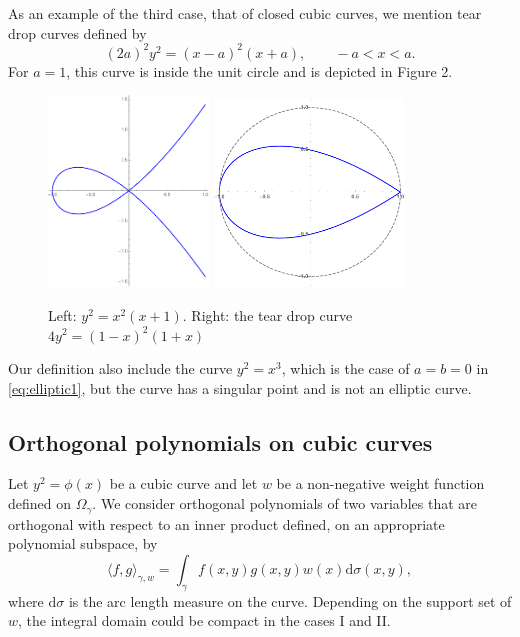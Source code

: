 \documentclass{amsart}
\theoremstyle{remark}
\def\la{{\langle}}
\def\ra{{\rangle}}
\def\d{\mathrm{d}}
\def\g{{\gamma}}
\def\s{\sigma}
\def\la{{\langle}}
\def\ra{{\rangle}}
\begin{document}
As an example of the third case, that of closed cubic curves, we mention tear drop curves defined by 
$$
     (2a)^2 y^2 = (x-a)^2 (x+a), \qquad -a < x < a. 
$$
For $a=1$, this curve is inside the unit circle and is depicted in Figure 2. 
\begin{figure}[ht]
  \begin{center}
    \includegraphics[width=0.38\textwidth]{elliptic3} \qquad\quad  \includegraphics[width=0.45\textwidth]{teardrop}
  \end{center} 
  \caption{Left:  $y^2= x^2(x+1)$. Right:  the tear drop curve $4 y^2= (1-x)^2 (1+x)$}
\end{figure}

Our definition also include the curve $y^2 = x^3$, which is the case of $a= b = 0$ in \eqref{eq:elliptic1},
but the curve has a singular point and is not an elliptic curve. 

\subsection{Orthogonal polynomials on cubic curves}
Let $y^2=\phi(x)$ be a cubic curve and let $w$ be a non-negative weight function defined on $\Omega_\g$. 
We consider orthogonal polynomials of two variables that are orthogonal with respect to an inner product 
defined, on an appropriate polynomial subspace, by 
\begin{equation} \label{eq:ipd1}
  \la f,g\ra_{\g,w} = \int_{\g} f(x,y) g(x,y) w(x) \d \s(x,y),
\end{equation}
where $\d \s$ is the arc length measure on the curve. Depending on the support set of $w$, the integral
domain could be compact in the cases I and II. 
\end{document}
